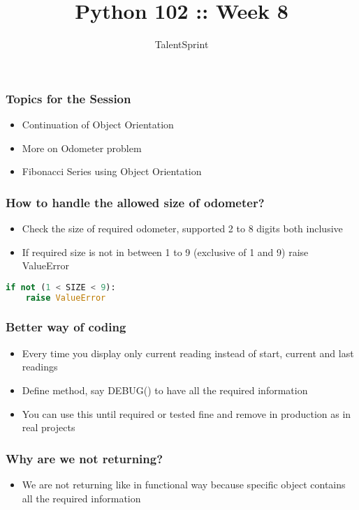\documentclass[14pt]{beamer}
\title{Python 102 :: Week 8}
\date{}
\author[TS]{TalentSprint}
\begin{document}
    \begin{frame}
        \titlepage
    \end{frame}
    \begin{frame}
        \frametitle{Topics for the Session}
        \begin{itemize}
            \item Continuation of Object Orientation
            \item More on Odometer problem
            \item Fibonacci Series using Object Orientation
        \end{itemize}
    \end{frame}

    \begin{frame}[containsverbatim]
        \frametitle{How to handle the allowed size of odometer?}
        \begin{itemize}
        \item Check the size of required odometer, supported 2 to 8 digits both inclusive
        \item If required size is not in between 1 to 9 (exclusive of 1 and 9) raise ValueError
        \end{itemize}
        \begin{lstlisting}[language=Python]
if not (1 < SIZE < 9):
	raise ValueError
        \end{lstlisting}
    \end{frame}

    \begin{frame}[containsverbatim]
        \frametitle{Better way of coding}
        \begin{itemize}
        \item Every time you display only current reading instead of start, current and last readings
        \item Define method, say DEBUG() to have all the required information
        \item You can use this until required or tested fine and remove in production as in real projects
        \end{itemize}
    \end{frame}

    \begin{frame}[containsverbatim]
        \frametitle{Why are we not returning?}
        \begin{itemize}
        \item We are not returning like in functional way because specific object contains all the required information        
        \end{itemize}
    \end{frame}
\end{document}
